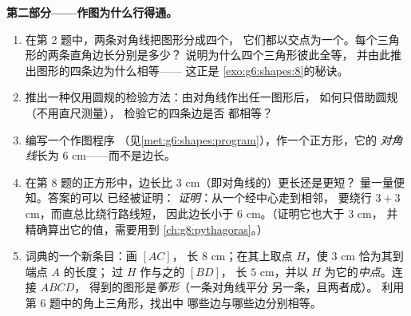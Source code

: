 \begin{problem}
\medskip
\noindent\textbf{第二部分——作图为什么行得通。}
\begin{enumerate}[resume]
  \item 在第 2 题中，两条对角线把图形分成四个，
        它们都以交点为一个。每个三角形的两条直角边长分别是多少？
        说明为什么四个三角形彼此全等，
        并由此推出图形的四条边为什么相等——
        这正是
        \cref{exo:g6:shapes:8}的秘诀。
  \item 推出一种仅用圆规的检验方法：由对角线作出任一图形后，
        如何只借助圆规（不用直尺测量），
        检验它的四条边是否
        都相等？
  \item 编写一个作图程序
        （见\cref{met:g6:shapes:program}），作一个正方形，它的
        \emph{对角线}长为 $6$ cm——而不是边长。
  \item 在第 8 题的正方形中，边长比 $3$ cm（即对角线的）更长还是更短？
        量一量便知。答案的可以
        已经被证明：
        \emph{证明}：从一个经中心走到相邻，
        要绕行 $3 + 3$ cm，而直总比绕行路线短，
        因此边长小于
        $6$ cm。（证明它也大于 $3$ cm，
        并精确算出它的值，需要用到
        \cref{ch:g8:pythagoras}。）
  \item 词典的一个新条目：画 $[AC]$，
        长 $8$ cm；在其上取点 $H$，使 $3$ cm 恰为其到端点 $A$ 的长度；
        过 $H$ 作与之的 $[BD]$，
        长 $5$ cm，并以 $H$ 为它的\emph{中点}。连接 $ABCD$，
        得到的图形是\emph{筝形}（一条对角线平分
        另一条，且两者成）。
        利用第 6 题中的角上三角形，找出中
        哪些边与哪些边分别相等。
\end{enumerate}


\end{problem}
